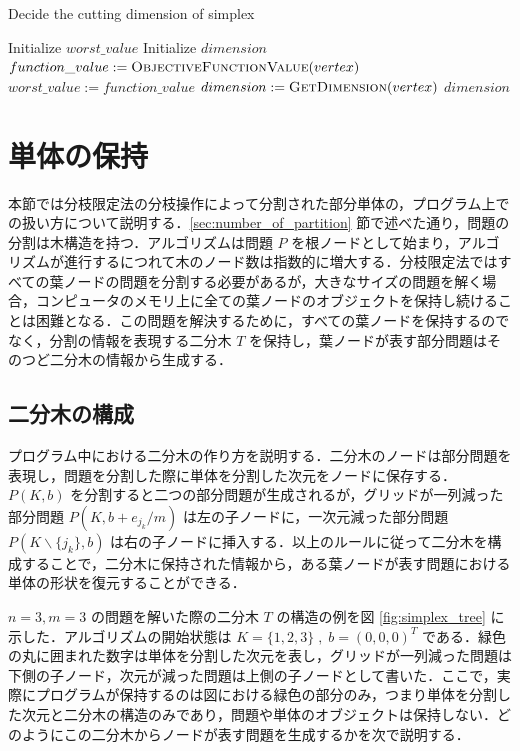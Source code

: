 \documentclass[a4paper,11pt]{jreport}
\begin{document}
\begin{algorithm}
\caption{Decide the cutting dimension of simplex}
\label{algo:cutting_dimension}
\begin{algorithmic}[1]
\State Initialize $ worst\_value $
\State Initialize $ dimension $
\State $ function\_value := \Call{ObjectiveFunctionValue}{vertex} $
\State $ worst\_value := function\_value $
\State $ dimension := \Call{GetDimension}{vertex} $
\EndIf
\EndFor
\State \Return $ dimension $
\EndFunction
\end{algorithmic}
\end{algorithm}

\section{単体の保持}

本節では分枝限定法の分枝操作によって分割された部分単体の，プログラム上での扱い方について説明する．\ref{sec:number_of_partition} 節で述べた通り，問題の分割は木構造を持つ．アルゴリズムは問題 $ P $ を根ノードとして始まり，アルゴリズムが進行するにつれて木のノード数は指数的に増大する．分枝限定法ではすべての葉ノードの問題を分割する必要があるが，大きなサイズの問題を解く場合，コンピュータのメモリ上に全ての葉ノードのオブジェクトを保持し続けることは困難となる．この問題を解決するために，すべての葉ノードを保持するのでなく，分割の情報を表現する二分木 $ T $ を保持し，葉ノードが表す部分問題はそのつど二分木の情報から生成する．\par

\subsection{二分木の構成}

プログラム中における二分木の作り方を説明する．二分木のノードは部分問題を表現し，問題を分割した際に単体を分割した次元をノードに保存する．$ P(K, b) $ を分割すると二つの部分問題が生成されるが，グリッドが一列減った部分問題 $ P(K, b + e_{j_k} / m) $ は左の子ノードに，一次元減った部分問題 $ P(K \backslash \{ j_k \}, b) $ は右の子ノードに挿入する．以上のルールに従って二分木を構成することで，二分木に保持された情報から，ある葉ノードが表す問題における単体の形状を復元することができる．\par
$ n = 3, m = 3 $ の問題を解いた際の二分木 $ T $ の構造の例を図 \ref{fig:simplex_tree} に示した．アルゴリズムの開始状態は $ K = \{1, 2, 3\} \; , \; b = (0, 0, 0)^T $ である．緑色の丸に囲まれた数字は単体を分割した次元を表し，グリッドが一列減った問題は下側の子ノード，次元が減った問題は上側の子ノードとして書いた．ここで，実際にプログラムが保持するのは図における緑色の部分のみ，つまり単体を分割した次元と二分木の構造のみであり，問題や単体のオブジェクトは保持しない．どのようにこの二分木からノードが表す問題を生成するかを次で説明する．\par
\end{document}
